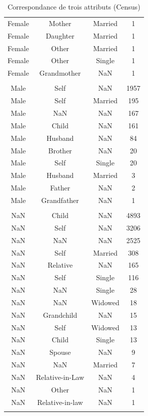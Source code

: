 \documentclass[a4paper,12pt,twoside]{book}
\begin{document}
\begin{longtable}{|c|c|c|c|}
                Female & Mother & Married & 1 \\
                Female & Daughter & Married & 1 \\
                Female & Other & Married & 1 \\
                Female & Other & Single & 1 \\
                Female & Grandmother & NaN & 1 \\\hline
                \multicolumn{4}{|c|}{} \\[-14pt]\hline
                Male & Self & NaN & 1957 \\
                Male & Self & Married & 195 \\
                Male & NaN & NaN & 167 \\
                Male & Child & NaN & 161 \\
                Male & Husband & NaN & 84 \\
                Male & Brother & NaN & 20 \\
                Male & Self & Single & 20 \\
                Male & Husband & Married & 3 \\
                Male & Father & NaN & 2 \\
                Male & Grandfather & NaN & 1 \\\hline
                \multicolumn{4}{|c|}{} \\[-14pt]\hline
                NaN & Child & NaN & 4893 \\
                NaN & Self & NaN & 3206 \\
                NaN & NaN & NaN & 2525 \\
                NaN & Self & Married & 308 \\
                NaN & Relative & NaN & 165 \\
                NaN & Self & Single & 116 \\
                NaN & NaN & Single & 28 \\
                NaN & NaN & Widowed & 18 \\
                NaN & Grandchild & NaN & 15 \\
                NaN & Self & Widowed & 13 \\
                NaN & Child & Single & 13 \\
                NaN & Spouse & NaN & 9 \\
                NaN & NaN & Married & 7 \\
                NaN & Relative-in-Law & NaN & 4 \\
                NaN & Other & NaN & 1 \\
                NaN & Relative-in-law & NaN & 1 \\\hline
            \caption{Correspondance de trois attributs (Census)}
            \label{tab7bis}
            \end{longtable}
\end{document}
